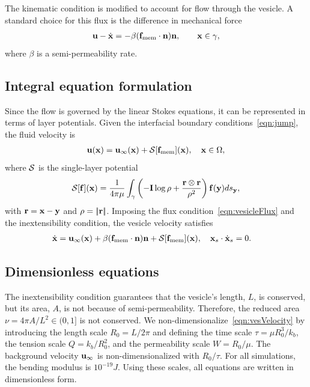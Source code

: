\documentclass[9pt,twocolumn,twoside,lineno]{pnas-new}
\begin{document}
The kinematic condition is modified to account for flow through the
vesicle. A standard choice for this flux is the difference in mechanical
force~\cite{yao-mor2017}
\begin{align}
  \label{eqn:vesicleFlux}
  \mathbf{u} - \dot{\mathbf{x}} = - \beta (\mathbf{f}_\mathrm{mem} \cdot \mathbf{n}) \mathbf{n}, \qquad
  \mathbf{x} \in \gamma,
\end{align}
where $\beta$ is a semi-permeability rate.  


\subsection*{Integral equation formulation}
Since the flow is governed by the linear Stokes equations, it can be
represented in terms of layer potentials. Given the interfacial boundary
conditions~\eqref{eqn:jump}, the fluid velocity is
\begin{align}
  \mathbf{u}(\mathbf{x}) = \mathbf{u}_\infty(\mathbf{x}) + \mathcal{S}[\mathbf{f}_\mathrm{mem}](\mathbf{x}), \quad
    \mathbf{x} \in \Omega,
\end{align}
where $\mathcal{S}$ is the single-layer potential
\begin{align}
  \mathcal{S}[\mathbf{f}](\mathbf{x}) = \frac{1}{4\pi\mu} \int_{\gamma} \left(
    -\mathbf{I} \log\rho + \frac{\mathbf{r} \otimes \mathbf{r}}{\rho^2} \right)
    \mathbf{f}(\mathbf{y}) ds_{\mathbf{y}},
\end{align}
with $\mathbf{r} = \mathbf{x} - \mathbf{y}$ and $\rho = |\!| \mathbf{r} |\!|$. Imposing the flux
condition~\eqref{eqn:vesicleFlux} and the inextensibility condition, the
vesicle velocity satisfies
\begin{align}
  \label{eqn:vesVelocity}
  \dot{\mathbf{x}} &= \mathbf{u}_\infty(\mathbf{x}) + \beta (\mathbf{f}_\mathrm{mem}\cdot\mathbf{n})\mathbf{n}
  + \mathcal{S} [\mathbf{f}_\mathrm{mem}](\mathbf{x}),  \quad
  \mathbf{x}_s \cdot \dot{\mathbf{x}}_s = 0.
\end{align}

\subsection*{Dimensionless equations}
The inextensibility condition guarantees that the vesicle's length, $L$,
is conserved, but its area, $A$, is not because of semi-permeability.
Therefore, the reduced area $\nu = 4\pi A/L^2 \in (0,1]$ is not
conserved. We non-dimensionalize~\eqref{eqn:vesVelocity} by introducing
the length scale $R_0 = L/2\pi$ and defining the time scale $\tau = \mu
R_0^3/k_b$, the tension scale $Q = k_b/R_0^2$, and the permeability
scale $W = R_0/\mu$. The background velocity $\mathbf{u}_\infty$ is
non-dimensionalized with $R_0/\tau$. For all simulations, the bending
modulus is $10^{-19}J$. Using these scales, all equations are written in
dimensionless form.
\end{document}
